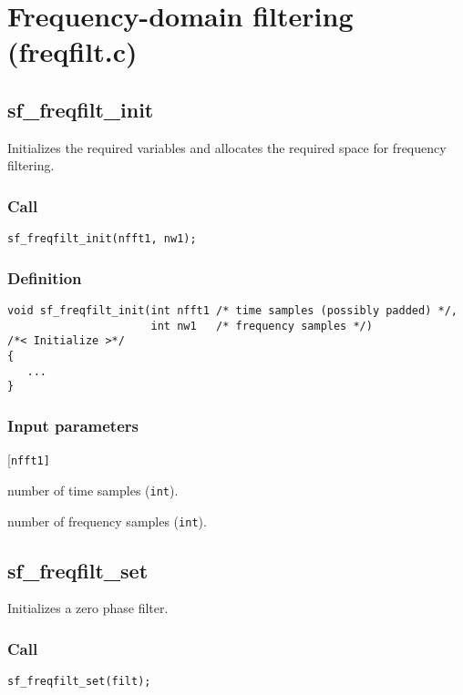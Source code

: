 \section{Frequency-domain filtering (freqfilt.c)}




\subsection{{sf\_freqfilt\_init}}\label{sec:sf_freqfilt_init}
Initializes the required variables and allocates the required space for frequency filtering.

\subsubsection*{Call}
\begin{verbatim}sf_freqfilt_init(nfft1, nw1);\end{verbatim}

\subsubsection*{Definition}
\begin{verbatim}
void sf_freqfilt_init(int nfft1 /* time samples (possibly padded) */, 
                      int nw1   /* frequency samples */)
/*< Initialize >*/
{
   ...
}
\end{verbatim}

\subsubsection*{Input parameters}
\begin{desclist}{\tt }{\quad}[\tt nfft1]
   \setlength\itemsep{0pt}
   \item[nfft1] number of time samples (\texttt{int}).  
   \item[nw1]   number of frequency samples (\texttt{int}).  
\end{desclist}




\subsection{{sf\_freqfilt\_set}}
Initializes a zero phase filter.

\subsubsection*{Call}
\begin{verbatim}sf_freqfilt_set(filt);\end{verbatim}

